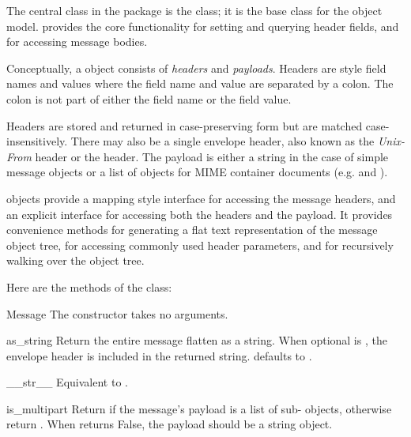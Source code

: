 
The central class in the  package is the
 class; it is the base class for the 
object model.   provides the core functionality for
setting and querying header fields, and for accessing message bodies.

Conceptually, a  object consists of \emph{headers} and
\emph{payloads}.  Headers are  style field names and
values where the field name and value are separated by a colon.  The
colon is not part of either the field name or the field value.

Headers are stored and returned in case-preserving form but are
matched case-insensitively.  There may also be a single envelope
header, also known as the \emph{Unix-From} header or the
 header.  The payload is either a string in the case of
simple message objects or a list of  objects for
MIME container documents (e.g.  and
).

 objects provide a mapping style interface for
accessing the message headers, and an explicit interface for accessing
both the headers and the payload.  It provides convenience methods for
generating a flat text representation of the message object tree, for
accessing commonly used header parameters, and for recursively walking
over the object tree.

Here are the methods of the  class:

\begin{classdesc}{Message}{}
The constructor takes no arguments.
\end{classdesc}

\begin{methoddesc}[Message]{as_string}{}
Return the entire message flatten as a string.  When optional
 is , the envelope header is included in the
returned string.   defaults to .
\end{methoddesc}

\begin{methoddesc}[Message]{__str__}{}
Equivalent to .
\end{methoddesc}

\begin{methoddesc}[Message]{is_multipart}{}
Return  if the message's payload is a list of
sub- objects, otherwise return .  When
 returns False, the payload should be a string
object.
\end{methoddesc}

